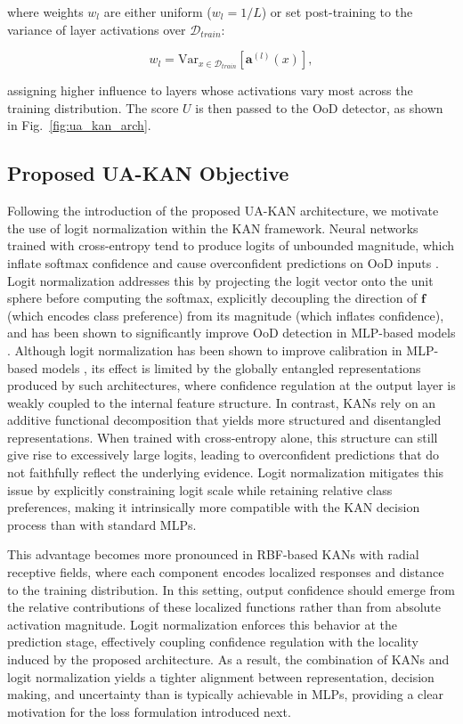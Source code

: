 \documentclass[conference]{IEEEtran}
\begin{document}
where weights $w_l$ are either uniform ($w_l = 1/L$) or set post-training to the variance of layer activations over $\mathcal{D}_{train}$:

\begin{equation} \label{eq:layerweights}
w_l = \mathrm{Var}_{x \in \mathcal{D}_{train}}\!\left[\mathbf{a}^{(l)}(x)\right],
\end{equation}

assigning higher influence to layers whose activations vary most across the training distribution. The score $U$ is then passed to the OoD detector, as shown in Fig.~\ref{fig:ua_kan_arch}.



\subsection{Proposed UA-KAN Objective}

Following the introduction of the proposed UA-KAN architecture, we motivate the use of logit normalization within the KAN framework. Neural networks trained with cross-entropy tend to produce logits of unbounded magnitude, which inflate softmax confidence and cause overconfident predictions on OoD inputs \cite{wei2022mitigating}. Logit normalization addresses this by projecting the logit vector onto the unit sphere before computing the softmax, explicitly decoupling the direction of $\mathbf{f}$ (which encodes class preference) from its magnitude (which inflates confidence), and has been shown to significantly improve OoD detection in MLP-based models \cite{wei2022mitigating}. Although logit normalization has been shown to improve calibration in MLP-based models \cite{wei2022mitigating}, its effect is limited by the globally entangled representations produced by such architectures, where confidence regulation at the output layer is weakly coupled to the internal feature structure. In contrast, KANs rely on an additive functional decomposition that yields more structured and disentangled representations. When trained with cross-entropy alone, this structure can still give rise to excessively large logits, leading to overconfident predictions that do not faithfully reflect the underlying evidence. Logit normalization mitigates this issue by explicitly constraining logit scale while retaining relative class preferences, making it intrinsically more compatible with the KAN decision process than with standard MLPs.

This advantage becomes more pronounced in RBF-based KANs with radial receptive fields, where each component encodes localized responses and distance to the training distribution. In this setting, output confidence should emerge from the relative contributions of these localized functions rather than from absolute activation magnitude. Logit normalization enforces this behavior at the prediction stage, effectively coupling confidence regulation with the locality induced by the proposed architecture. As a result, the combination of KANs and logit normalization yields a tighter alignment between representation, decision making, and uncertainty than is typically achievable in MLPs, providing a clear motivation for the loss formulation introduced next.
\end{document}
